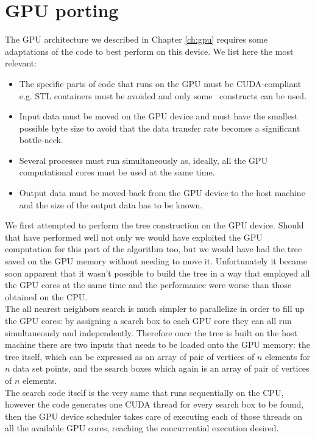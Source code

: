 \section{GPU porting}\label{sec:volume_kdtree_gpuport}
The GPU architecture we described in Chapter \ref{ch:gpu} requires some adaptations of the code to best perform on this device. We list here the most relevant:
\begin{itemize}
\item The specific parts of code that runs on the GPU must be CUDA-compliant e.g. STL containers must be avoided and only some \CC\ constructs can be used.
\item Input data must be moved on the GPU device and must have the smallest possible byte size to avoid that the data transfer rate becomes a significant bottle-neck.
\item Several processes must run simultaneously as, ideally, all the GPU computational cores must be used at the same time.
\item Output data must be moved back from the GPU device to the host machine and the size of the output data has to be known.
\end{itemize}
We first attempted to perform the tree construction on the GPU device. Should that have performed well not only we would have exploited the GPU computation for this part of the algorithm too, but we would have had the tree saved on the GPU memory without needing to move it. Unfortunately it became soon apparent that it wasn't possible to build the tree in a way that employed all the GPU cores at the same time and the performance were worse than those obtained on the CPU.\\
The all nearest neighbors search is much simpler to parallelize in order to fill up the GPU cores: by assigning a search box to each GPU core they can all run simultaneously and independently. Therefore once the tree is built on the host machine there are two inputs that needs to be loaded onto the GPU memory: the tree itself, which can be expressed as an array of pair of vertices of $n$ elements for $n$ data set points, and the search boxes which again is an array of pair of vertices of $n$ elements.\\
The search code itself is the very same that runs sequentially on the CPU, however the code generates one CUDA thread for every search box to be found, then the GPU device scheduler takes care of executing each of those threads on all the available GPU cores, reaching the concurrential execution desired.\\

